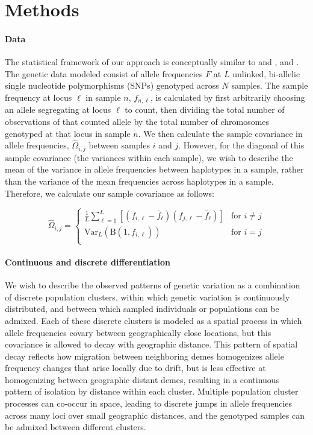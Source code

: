 \documentclass[12pt]{article}
\newcommand{\gb}[1]{{\it\color{magenta}{(#1)}}}
\begin{document}
\section*{Methods}
\paragraph{Data}
The statistical framework of our approach is conceptually similar to \cite{Wasser2004} and \cite{BEDASSLE}, and \cite{spacemix}.
The genetic data modeled consist of allele frequencies $F$ at $L$ unlinked, bi-allelic single nucleotide polymorphisms (SNPs) genotyped across $N$ samples.
The sample frequency at locus $\ell$ in sample $n$, $f_{n,\ell}$, is calculated by first arbitrarily choosing an allele segregating 
at locus $\ell$ to count, 
then dividing the total number of observations of that counted allele by the total number of chromosomes genotyped at that locus
in sample $n$.
We then calculate the sample covariance in allele frequencies, $\widehat{\Omega}_{i,j}$ between samples $i$ and $j$.
However, for the diagonal of this sample covariance (the variances within each sample),
we wish to describe the mean of the variance in allele frequencies between haplotypes in a sample, 
rather than the variance of the mean frequencies across haplotypes in a sample.
Therefore, we calculate our sample covariance as follows:


\begin{equation}
\widehat{\Omega}_{i,j} = 
	\begin{cases}
		\frac{1}{L}
		\sum\limits_{\ell=1}^{L}{\left[ 	\left(f_{i,\ell} - \bar{f}_{\ell} \right)
		 	\left(f_{j,\ell} - \bar{f}_{\ell} \right)\right]
			} & \text{for } i \neq j \\
		\text{Var}_L\left( \text{B}(1,f_{i,\ell})	\right) & \text{for } i = j \\
	\end{cases}
\label{sample_covariance}
\end{equation}
\gb{ideas for how to describe what I'm doing on the diagonal in actual math notation?}

\paragraph{Continuous and discrete differentiation}
We wish to describe the observed patterns of genetic variation as a combination of 
discrete population clusters,
within which genetic variation is continuously distributed, 
and between which sampled individuals or populations can be admixed.
Each of these discrete clusters is modeled as a spatial process in which
allele frequencies covary between geographically close locations,
but this covariance is allowed to decay with geographic distance.
This pattern of spatial decay reflects how migration between neighboring demes  
homogenizes allele frequency changes that arise locally due to drift, 
but is less effective at homogenizing between geographic distant demes,
resulting in a continuous pattern of isolation by distance within each cluster.
Multiple population cluster processes can co-occur in space, 
leading to discrete jumps in allele frequencies across many loci over small geographic distances,
and the genotyped samples can be admixed between different clusters.
\end{document}
